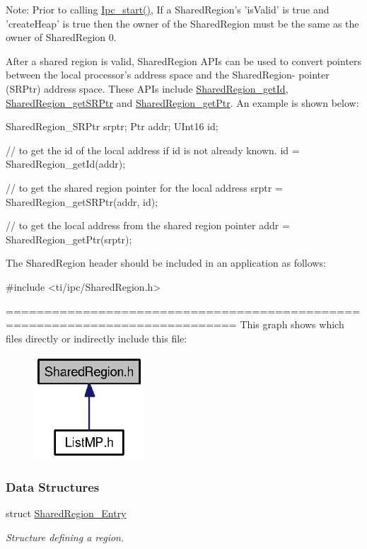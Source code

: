 Note: Prior to calling \hyperlink{_ipc_8h_aca550c6a5498637cfec7b0f4e6d07828}{Ipc\_\-start()}, If a SharedRegion's 'isValid' is true and 'createHeap' is true then the owner of the SharedRegion must be the same as the owner of SharedRegion 0.

After a shared region is valid, SharedRegion APIs can be used to convert pointers between the local processor's address space and the SharedRegion-\/ pointer (SRPtr) address space. These APIs include \hyperlink{_shared_region_8h_afc6f82dd851547d6d6221a779be945dd}{SharedRegion\_\-getId}, \hyperlink{_shared_region_8h_a7362baec546e36b21e82f35746b4ab3b}{SharedRegion\_\-getSRPtr} and \hyperlink{_shared_region_8h_a2b64c07cb305a034417a42fb1ed8e7a9}{SharedRegion\_\-getPtr}. An example is shown below:


\begin{DoxyCode}
  SharedRegion_SRPtr srptr;
  Ptr     addr;
  UInt16  id;

  // to get the id of the local address if id is not already known.
  id = SharedRegion_getId(addr);

  // to get the shared region pointer for the local address
  srptr = SharedRegion_getSRPtr(addr, id);

  // to get the local address from the shared region pointer
  addr = SharedRegion_getPtr(srptr);
\end{DoxyCode}


The SharedRegion header should be included in an application as follows: 
\begin{DoxyCode}
  #include <ti/ipc/SharedRegion.h>
\end{DoxyCode}


============================================================================ This graph shows which files directly or indirectly include this file:
\nopagebreak
\begin{figure}[H]
\begin{center}
\leavevmode
\includegraphics[width=117pt]{_shared_region_8h__dep__incl}
\end{center}
\end{figure}
\subsubsection*{Data Structures}
\begin{DoxyCompactItemize}
\item 
struct \hyperlink{struct_shared_region___entry}{SharedRegion\_\-Entry}
\begin{DoxyCompactList}\small\item\em Structure defining a region. \item\end{DoxyCompactList}\end{DoxyCompactItemize}
